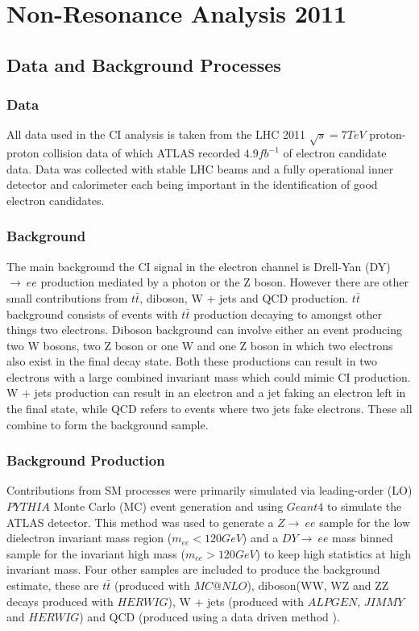 \chapter{Non-Resonance Analysis 2011}





\section{Data and Background Processes}

\subsection{Data}
All data used in the CI analysis is taken from the LHC 2011 $\sqrt{s} = 7 TeV$ proton-proton collision data  of which ATLAS recorded $4.9 fb^{-1}$ of electron candidate data. Data was collected with stable LHC beams and a fully operational inner detector and calorimeter each being important in the identification of good electron candidates.

\subsection{Background}
The main background the CI signal in the electron channel is Drell-Yan (DY) $\rightarrow~ee$ production mediated by a photon or the Z boson. However there are other small contributions from $t\bar{t}$, diboson, W + jets and QCD production. $t\bar{t}$ background consists of events with $t\bar{t}$ production decaying to amongst other things two electrons. Diboson background can involve either an event producing two W bosons, two Z boson or one W and one Z boson in which two electrons also exist in the final decay state. Both these productions can result in two electrons with a large combined invariant mass which could mimic CI production. W + jets production can result in an electron and a jet faking an electron left in the final state, while QCD refers to events where two jets fake electrons. These all combine to form the background sample.

\subsection{Background Production}
Contributions from SM processes were primarily simulated via leading-order (LO) $PYTHIA$ \cite{pythia} Monte Carlo (MC) event generation and using $Geant 4$ \cite{geant} to simulate the ATLAS detector. This method was used to generate a $Z\rightarrow~ee$ sample for the low dielectron invariant mass region ($m_{ee} < 120 GeV$) and a $DY\rightarrow~ee$ mass binned sample for the invariant high mass ($m_{ee} > 120 GeV$) to keep high statistics at high invariant mass. Four other samples are included to produce the background estimate, these are $t\bar{t}$ (produced with $MC@NLO$), diboson(WW, WZ and ZZ decays produced with $HERWIG$), W + jets (produced with $ALPGEN$, $JIMMY$ and $HERWIG$) and QCD (produced using a data driven method \cite{QCD}).

